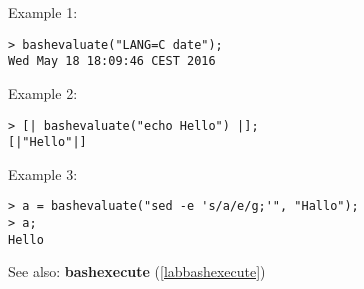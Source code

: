 \noindent Example 1: 
\begin{center}\begin{minipage}{15cm}\begin{Verbatim}[frame=single]
> bashevaluate("LANG=C date");
Wed May 18 18:09:46 CEST 2016
\end{Verbatim}
\end{minipage}\end{center}
\noindent Example 2: 
\begin{center}\begin{minipage}{15cm}\begin{Verbatim}[frame=single]
> [| bashevaluate("echo Hello") |];
[|"Hello"|]
\end{Verbatim}
\end{minipage}\end{center}
\noindent Example 3: 
\begin{center}\begin{minipage}{15cm}\begin{Verbatim}[frame=single]
> a = bashevaluate("sed -e 's/a/e/g;'", "Hallo");
> a;
Hello
\end{Verbatim}
\end{minipage}\end{center}
See also: \textbf{bashexecute} (\ref{labbashexecute})
